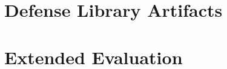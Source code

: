 \documentclass[letterpaper,twocolumn,10pt]{article}
\begin{document}
\section{Defense Library Artifacts}
\label{app:library-artifacts}




\section{Extended Evaluation}
\label{app:extended-evaluation}







% 
\end{document}
